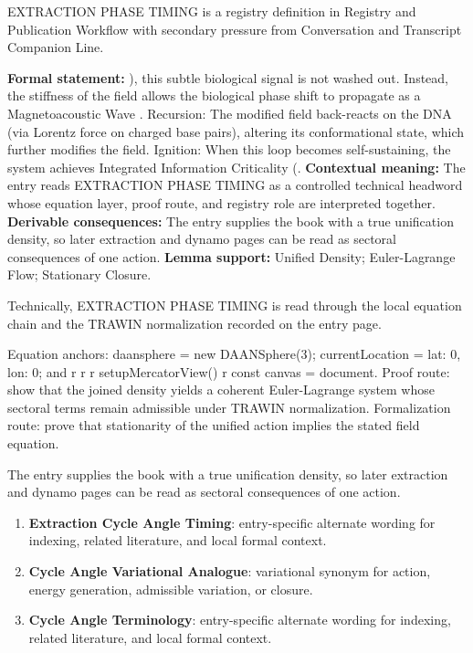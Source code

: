 
\begingroup\small
{}
EXTRACTION PHASE TIMING is a registry definition in Registry and Publication Workflow with secondary pressure from Conversation and Transcript Companion Line.

\begingroup\footnotesize\setlength{\emergencystretch}{3em}\sloppy
\textbf{Formal statement:} ), this subtle biological signal is not washed out. Instead, the stiffness of the field allows the biological phase shift to propagate as a Magnetoacoustic Wave . Recursion: The modified field back-reacts on the DNA (via Lorentz force on charged base pairs), altering its conformational state, which further modifies the field. Ignition: When this loop becomes self-sustaining, the system achieves Integrated Information Criticality (. \textbf{Contextual meaning:} The entry reads EXTRACTION PHASE TIMING as a controlled technical headword whose equation layer, proof route, and registry role are interpreted together. \textbf{Derivable consequences:} The entry supplies the book with a true unification density, so later extraction and dynamo pages can be read as sectoral consequences of one action. \textbf{Lemma support:} Unified Density; Euler-Lagrange Flow; Stationary Closure.\par
\endgroup

Technically, EXTRACTION PHASE TIMING is read through the local equation chain and the TRAWIN normalization recorded on the entry page.

Equation anchors: daansphere = new DAANSphere(3); currentLocation = lat: 0, lon: 0; and r r r setupMercatorView() r const canvas = document. Proof route: show that the joined density yields a coherent Euler-Lagrange system whose sectoral terms remain admissible under TRAWIN normalization. Formalization route: prove that stationarity of the unified action implies the stated field equation.

The entry supplies the book with a true unification density, so later extraction and dynamo pages can be read as sectoral consequences of one action.
\endgroup

\begin{enumerate}[leftmargin=1.6em,itemsep=6pt,topsep=4pt]
\item \textbf{Extraction Cycle Angle Timing}: entry-specific alternate wording for indexing, related literature, and local formal context.
\item \textbf{Cycle Angle Variational Analogue}: variational synonym for action, energy generation, admissible variation, or closure.
\item \textbf{Cycle Angle Terminology}: entry-specific alternate wording for indexing, related literature, and local formal context.
\end{enumerate}

